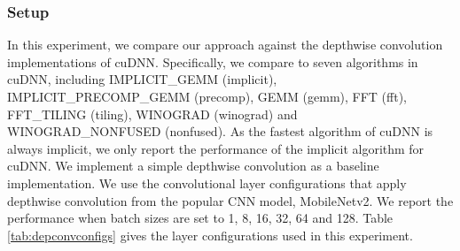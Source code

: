\subsubsection{Setup} In this experiment, we compare our approach against the depthwise convolution implementations of cuDNN. Specifically, we compare to seven algorithms in cuDNN, including IMPLICIT\_GEMM (implicit), IMPLICIT\_PRECOMP\_GEMM (precomp), GEMM (gemm), FFT (fft), FFT\_TILING (tiling), WINOGRAD (winograd) and WINOGRAD\_NONFUSED (nonfused). 
As the fastest algorithm of cuDNN is always implicit, we only report the performance of the implicit algorithm for cuDNN. 
We implement a simple depthwise convolution as a baseline implementation. 
We use the convolutional layer configurations that apply depthwise convolution from the popular CNN model, MobileNetv2. 
We report the performance when batch sizes are set to 1, 8, 16, 32, 64 and 128. 
Table \ref{tab:depconvconfigs} gives the layer configurations used in this experiment.


